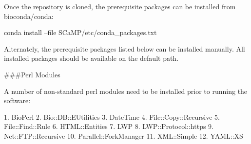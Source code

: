 \documentclass[a4paper,10pt]{article}
\begin{document}
Once the repository is cloned, the prerequisite packages can be installed from bioconda/conda:           

conda install --file SCaMP/etc/conda_packages.txt   

Alternately, the prerequisite packages listed below can be installed manually.                           
All installed packages should be available on the default path.                                          

###Perl Modules                                     

A number of non-standard perl modules need to be installed prior to running the                          
software:                                           

1. BioPerl                                          
2. Bio::DB::EUtilities                              
3. DateTime                                         
4. File::Copy::Recursive                            
5. File::Find::Rule                                 
6. HTML::Entities                                   
7. LWP                                              
8. LWP::Protocol::https                             
9. Net::FTP::Recursive                              
10. Parallel::ForkManager                           
11. XML::Simple                                     
12. YAML::XS            
\end{document}
